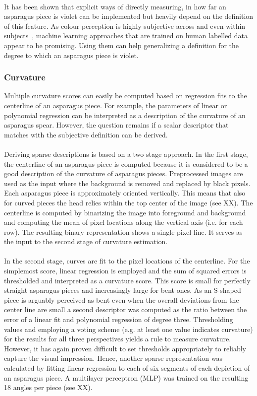 \\
It has been shown that explicit ways of directly measuring, in how far an asparagus piece is violet can be implemented but heavily depend on the definition of this feature. As colour perception is highly subjective across and even within subjects~\citep{reeves1981metacontrast}, machine learning approaches that are trained on human labelled data appear to be promising. Using them can help generalizing a definition for the degree to which an asparagus piece is violet.


\subsubsection{Curvature}
\label{subsec:Curvature}

Multiple curvature scores can easily be computed based on regression fits to the centerline of an asparagus piece. For example, the parameters of linear or polynomial regression can be interpreted as a description of the curvature of an asparagus spear. However, the question remains if a scalar descriptor that matches with the subjective definition can be derived. \\
\\
Deriving sparse descriptions is based on a two stage approach. In the first stage, the centerline of an asparagus piece is computed because it is considered to be a good description of the curvature of asparagus pieces. Preprocessed images are used as the input where the background is removed and replaced by black pixels. Each asparagus piece is approximately oriented vertically. This means that also for curved pieces the head relies within the top center of the image (see XX). The centerline is computed by binarizing the image into foreground and background and computing the mean of pixel locations along the vertical axis (i.e. for each row). The resulting binary representation shows a single pixel line. It serves as the input to the second stage of curvature estimation. \\
\\
In the second stage, curves are fit to the pixel locations of the centerline. For the simplemost score, linear regression is employed and the sum of squared errors is thresholded and interpreted as a curvature score. This score is small for perfectly straight asparagus pieces and increasingly large for bent ones. As an S-shaped piece is arguably perceived as bent even when the overall deviations from the center line are small a second descriptor was computed as the ratio between the error of a linear fit and polynomial regression of degree three. Thresholding values and employing a voting scheme (e.g. at least one value indicates curvature) for the results for all three perspectives yields a rule to measure curvature. However, it has again proven difficult to set thresholds appropriately to reliably capture the visual impression. Hence, another sparse representation was calculated by fitting linear regression to each of six segments of each depiction of an asparagus piece. A multilayer perceptron (MLP) was trained on the resulting 18 angles per piece (see XX). \\
